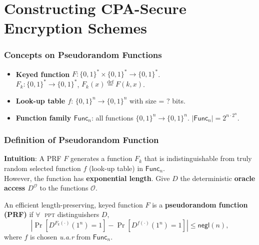 \section{Constructing CPA-Secure Encryption Schemes}
\begin{frame}\frametitle{Concepts on Pseudorandom Functions}
\begin{figure}
\begin{center}

\end{center}
\end{figure}
\begin{itemize}
\item \textbf{Keyed function} $F : \{0,1\}^* \times \{0,1\}^* \to \{0,1\}^*$. \\
$F_k : \{0,1\}^* \to \{0,1\}^*$, $F_k(x) \overset{\text{def}}{=} F(k,x)$.
\item \textbf{Look-up table $f$}: $\{0,1\}^n \to \{0,1\}^n$ with size \alert{ = ? bits}. %
\item \textbf{Function family $\mathsf{Func}_n$}: all functions $\{0,1\}^n \to \{0,1\}^n$. $|\mathsf{Func}_n| = 2^{n\cdot2^n}$.
\end{itemize}
\end{frame}
\begin{frame}\frametitle{Definition of Pseudorandom Function}
\textbf{Intuition}: A PRF $F$ generates a function $F_k$ that is indistinguishable from truly random selected function $f$ (look-up table) in $\mathsf{Func}_n$.\\ However, the function has \textbf{exponential length}. Give $D$ the deterministic \textbf{oracle access $D^{\mathcal{O}}$} to the functions $\mathcal{O}$.
\begin{definition}
An efficient length-preserving, keyed function $F$ is a \textbf{pseudorandom function (PRF)} if
$\forall\;$ \textsc{ppt} distinguishers $D$,
\[ \left|\Pr[D^{F_k(\cdot)}(1^n)=1] - \Pr[D^{f(\cdot)}(1^n)=1]\right| \le \mathsf{negl}(n),
\]
where $f$ is chosen \emph{u.a.r} from $\mathsf{Func}_n$.
\end{definition}

\end{frame}
